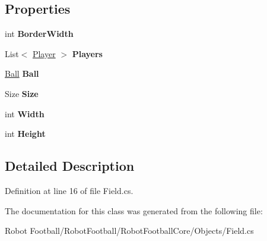 \subsection*{Properties}
\begin{DoxyCompactItemize}
\item 
\hypertarget{class_robot_football_core_1_1_objects_1_1_field_a70494c3ed542986019bf43dde9d6394b}{int {\bfseries Border\-Width}}\label{class_robot_football_core_1_1_objects_1_1_field_a70494c3ed542986019bf43dde9d6394b}

\item 
\hypertarget{class_robot_football_core_1_1_objects_1_1_field_a3a1d5cc60e8aeea0fb7a32c9fc91075a}{List$<$ \hyperlink{class_robot_football_core_1_1_objects_1_1_player}{Player} $>$ {\bfseries Players}}\label{class_robot_football_core_1_1_objects_1_1_field_a3a1d5cc60e8aeea0fb7a32c9fc91075a}

\item 
\hypertarget{class_robot_football_core_1_1_objects_1_1_field_a691a4b62fea1d355790550690f0a96ba}{\hyperlink{class_robot_football_core_1_1_objects_1_1_ball}{Ball} {\bfseries Ball}}\label{class_robot_football_core_1_1_objects_1_1_field_a691a4b62fea1d355790550690f0a96ba}

\item 
\hypertarget{class_robot_football_core_1_1_objects_1_1_field_a910d1120bbe8ff97ff581866d4004945}{Size {\bfseries Size}}\label{class_robot_football_core_1_1_objects_1_1_field_a910d1120bbe8ff97ff581866d4004945}

\item 
\hypertarget{class_robot_football_core_1_1_objects_1_1_field_a9c786444af933f990bcf2ecfea342e08}{int {\bfseries Width}}\label{class_robot_football_core_1_1_objects_1_1_field_a9c786444af933f990bcf2ecfea342e08}

\item 
\hypertarget{class_robot_football_core_1_1_objects_1_1_field_a0b9d3f1d7b878d140212d832f1fe86bc}{int {\bfseries Height}}\label{class_robot_football_core_1_1_objects_1_1_field_a0b9d3f1d7b878d140212d832f1fe86bc}

\end{DoxyCompactItemize}


\subsection{Detailed Description}


Definition at line 16 of file Field.\-cs.



The documentation for this class was generated from the following file\-:\begin{DoxyCompactItemize}
\item 
Robot Football/\-Robot\-Football/\-Robot\-Football\-Core/\-Objects/Field.\-cs\end{DoxyCompactItemize}
